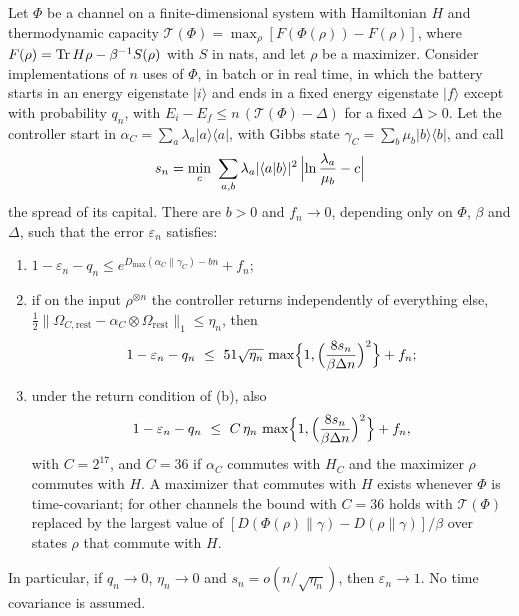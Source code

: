 \begin{proposition}\label{kt:prop:capital-converse}
Let $\Phi$ be a channel on a finite-dimensional system with Hamiltonian $H$ and thermodynamic capacity $\mathcal T(\Phi)=\max_\rho[F(\Phi(\rho))-F(\rho)]$, where $F(\rho)=\operatorname{Tr} H\rho-\beta^{-1}S(\rho)$ with $S$ in nats, and let $\rho$ be a maximizer. Consider implementations of $n$ uses of $\Phi$, in batch or in real time, in which the battery starts in an energy eigenstate $|i\rangle$ and ends in a fixed energy eigenstate $|f\rangle$ except with probability $q_n$, with $E_i-E_f\le n\,(\mathcal T(\Phi)-\Delta)$ for a fixed $\Delta>0$. Let the controller start in $\alpha_C=\sum_a\lambda_a|a\rangle\langle a|$, with Gibbs state $\gamma_C=\sum_b\mu_b|b\rangle\langle b|$, and call
\[
s_n=\min_c\ \sum_{a,b}\lambda_a|\langle a|b\rangle|^2\,\Bigl|\ln\frac{\lambda_a}{\mu_b}-c\Bigr|
\]
the spread of its capital. There are $b>0$ and $f_n\to0$, depending only on $\Phi$, $\beta$ and $\Delta$, such that the error $\varepsilon_n$ satisfies:
\begin{enumerate}
\item[(a)] $1-\varepsilon_n-q_n\le e^{D_{\max}(\alpha_C\|\gamma_C)-bn}+f_n$;
\item[(b)] if on the input $\rho^{\otimes n}$ the controller returns independently of everything else, $\tfrac12\|\Omega_{C,\mathrm{rest}}-\alpha_C\otimes\Omega_{\mathrm{rest}}\|_1\le\eta_n$, then
\[
1-\varepsilon_n-q_n\ \le\ 51\sqrt{\eta_n}\,\max\Bigl\{1,\Bigl(\frac{8s_n}{\beta\Delta n}\Bigr)^2\Bigr\}+f_n;
\]
\item[(c)] under the return condition of (b), also
\[
1-\varepsilon_n-q_n\ \le\ C\,\eta_n\,\max\Bigl\{1,\Bigl(\frac{8s_n}{\beta\Delta n}\Bigr)^2\Bigr\}+f_n,
\]
with $C=2^{17}$, and $C=36$ if $\alpha_C$ commutes with $H_C$ and the maximizer $\rho$ commutes with $H$. A maximizer that commutes with $H$ exists whenever $\Phi$ is time-covariant; for other channels the bound with $C=36$ holds with $\mathcal T(\Phi)$ replaced by the largest value of $[D(\Phi(\rho)\|\gamma)-D(\rho\|\gamma)]/\beta$ over states $\rho$ that commute with $H$.
\end{enumerate}
In particular, if $q_n\to0$, $\eta_n\to0$ and $s_n=o(n/\sqrt{\eta_n})$, then $\varepsilon_n\to1$. No time covariance is assumed.
\end{proposition}

